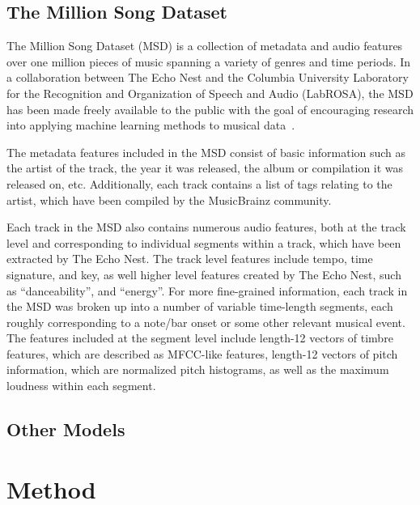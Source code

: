 \documentclass{article} %
\begin{document}
\subsection{The Million Song Dataset}
The Million Song Dataset (MSD) is a collection of metadata and audio features over one million pieces of music spanning a variety of genres and time periods. In a collaboration between The Echo Nest and the Columbia University Laboratory for the Recognition and Organization of Speech and Audio (LabROSA), the MSD has been made freely available to the public with the goal of encouraging research into applying machine learning methods to musical data~\cite{msd}.
\par The metadata features included in the MSD consist of basic information such as the artist of the track, the year it was released, the album or compilation it was released on, etc. Additionally, each track contains a list of tags relating to the artist, which have been compiled by the MusicBrainz community.
\par Each track in the MSD also contains numerous audio features, both at the track level and corresponding to individual segments within a track, which have been extracted by The Echo Nest. The track level features include tempo, time signature, and key, as well higher level features created by The Echo Nest, such as ``danceability'', and ``energy''. For more fine-grained information, each track in the MSD was broken up into a number of variable time-length segments, each roughly corresponding to a note/bar onset or some other relevant musical event. The features included at the segment level include length-12 vectors of timbre features, which are described as MFCC-like features, length-12 vectors of pitch information, which are normalized pitch histograms, as well as the maximum loudness within each segment.


\subsection{Other Models}


\section{Method}
\end{document}
